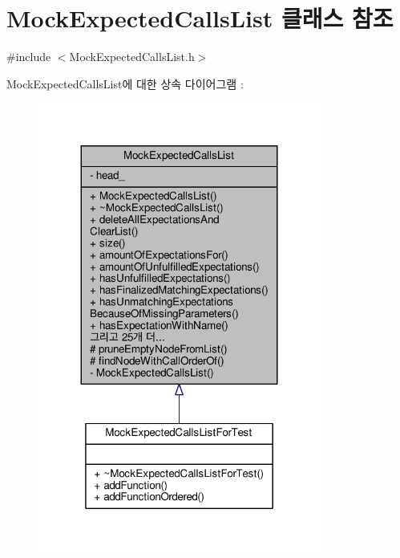 \hypertarget{class_mock_expected_calls_list}{}\section{Mock\+Expected\+Calls\+List 클래스 참조}
\label{class_mock_expected_calls_list}


{\ttfamily \#include $<$Mock\+Expected\+Calls\+List.\+h$>$}



Mock\+Expected\+Calls\+List에 대한 상속 다이어그램 \+: 
\nopagebreak
\begin{figure}[H]
\begin{center}
\leavevmode
\includegraphics[width=263pt]{class_mock_expected_calls_list__inherit__graph}
\end{center}
\end{figure}


